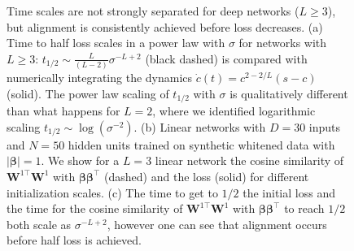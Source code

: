 \documentclass{article} %
\def\x{\bm x}
\newcommand{\cep}[1]{\textcolor{purple}{[Cengiz: #1]}}
\newcommand{\bb}[1]{\textcolor{red}{[Blake: #1]}}
\begin{document}
\begin{figure}
    \centering
    \caption{Time scales are not strongly separated for deep networks ($L \geq 3$), but alignment is consistently achieved  before loss decreases. (a) Time to half loss scales in a power law with $\sigma$ for networks with $L \geq 3$: $t_{1/2} \sim \frac{L}{(L-2)} \sigma^{-L+2}$ (black dashed) is compared with numerically integrating the dynamics $\dot{c}(t) = c^{2-2/L}(s-c)$ (solid). The power law scaling of $t_{1/2}$ with $\sigma$ is qualitatively different than what happens for $L =2$, where we identified logarithmic scaling $t_{1/2} \sim \log(\sigma^{-2})$. (b) Linear networks with $D=30$ inputs and $N=50$ hidden units trained on synthetic whitened data with $|\bm\beta|=1$. We show for a $L=3$ linear network the cosine similarity of $\bm W^{1 \top} \bm W^1$ with $\bm \beta \bm \beta^\top$ (dashed) and the loss (solid) for different initialization scales. (c) The time to get to $1/2$ the initial loss and the time for the cosine similarity of $\bm W^{1\top} \bm W^1$ with $\bm \beta \bm\beta^\top$ to reach $1/2$ both scale as $\sigma^{-L+2}$, however one can see that alignment occurs before half loss is achieved.  }
    \label{fig:time_to_align_learn_deep}
\end{figure}




\end{document}
